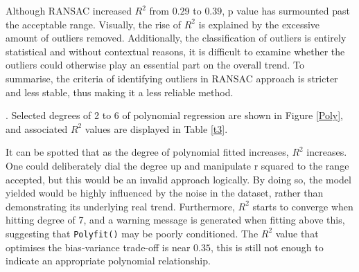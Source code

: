 \documentclass[12pt]{article}
\begin{document}
Although RANSAC increased $R^2$ from $0.29$ to $0.39$, p value has surmounted past the acceptable range. Visually, the rise of $R^2$ is explained by the excessive amount of outliers removed. Additionally, the classification of outliers is entirely statistical and without contextual reasons, it is difficult to examine whether the outliers could otherwise play an essential part on the overall trend. To summarise, the criteria of identifying outliers in RANSAC approach is stricter and less stable, thus making it a less reliable method. 


. 
Selected degrees of 2 to 6 of polynomial regression are shown in Figure  \eqref{Poly}, and associated $R^2$ values are displayed in Table \eqref{t3}. 


\begin{table}[H]
\begin{center}
\captionsetup{font=scriptsize}
\caption{coefficients related to the relationship between original and log-transformed total budget spent and obesity density} \label{t3}
\end{center}
\end{table}

It can be spotted that as the degree of polynomial fitted increases, $R^2$ increases. One could deliberately dial the degree up and manipulate r squared to the range accepted, but this would be an invalid approach logically. By doing so, the model yielded would be highly influenced by the noise in the dataset, rather than demonstrating its underlying real trend. Furthermore, $R^2$ starts to converge when hitting degree of 7, and a warning message is generated when fitting above this, suggesting that \verb|Polyfit()| may be poorly conditioned. The $R^2$ value that optimises the bias-variance trade-off is near $0.35$, this is still not enough to indicate an appropriate polynomial relationship. 
\end{document}
